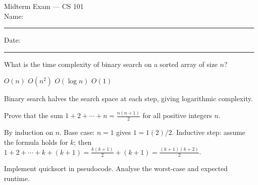 \documentclass[12pt,answers]{exam}
\begin{document}
\begin{center}
{\Large Midterm Exam --- CS 101} \\
\vspace{0.2cm}
Name: \rule{5cm}{0.2pt} \hfill Date: \rule{3cm}{0.2pt}
\end{center}

\begin{questions}

\question[10] What is the time complexity of binary search on a sorted array of size $n$?

\begin{choices}
  \choice $O(n)$
  \choice $O(n^2)$
  \CorrectChoice $O(\log n)$
  \choice $O(1)$
\end{choices}

\begin{solution}
Binary search halves the search space at each step, giving logarithmic complexity.
\end{solution}

\question[15] Prove that the sum $1 + 2 + \cdots + n = \frac{n(n+1)}{2}$ for all positive integers $n$.

\begin{solution}
By induction on $n$. Base case: $n = 1$ gives $1 = 1(2)/2$. Inductive step: assume the formula holds for $k$; then $1 + 2 + \cdots + k + (k+1) = \frac{k(k+1)}{2} + (k+1) = \frac{(k+1)(k+2)}{2}$.
\end{solution}

\question[25] Implement quicksort in pseudocode. Analyse the worst-case and expected runtime.

\fillwithlines{3in}

\end{questions}
\end{document}
